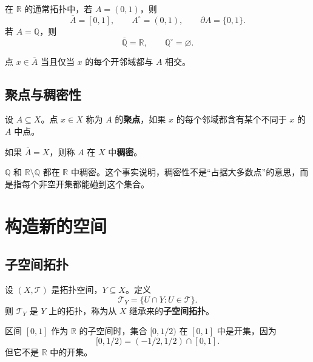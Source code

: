 \begin{example}
在 $\mathbb{R}$ 的通常拓扑中，若 $A=(0,1)$，则
\[
    \overline{A}=[0,1],\qquad A^\circ=(0,1),\qquad \partial A=\{0,1\}.
\]
若 $A=\mathbb{Q}$，则
\[
    \overline{\mathbb{Q}}=\mathbb{R},\qquad \mathbb{Q}^\circ=\varnothing.
\]
\end{example}

\begin{proposition}[用开邻域刻画闭包]
点 $x\in\overline{A}$ 当且仅当 $x$ 的每个开邻域都与 $A$ 相交。
\end{proposition}

\subsection{聚点与稠密性}

\begin{definition}[聚点]
设 $A\subseteq X$。点 $x\in X$ 称为 $A$ 的\textbf{聚点}，如果 $x$ 的每个邻域都含有某个不同于 $x$ 的 $A$ 中点。
\end{definition}

\begin{definition}[稠密子集]
如果 $\overline{A}=X$，则称 $A$ 在 $X$ 中\textbf{稠密}。
\end{definition}

\begin{example}
$\mathbb{Q}$ 和 $\mathbb{R}\setminus\mathbb{Q}$ 都在 $\mathbb{R}$ 中稠密。这个事实说明，稠密性不是“占据大多数点”的意思，而是指每个非空开集都能碰到这个集合。
\end{example}

\section{构造新的空间}

\subsection{子空间拓扑}

\begin{definition}[子空间拓扑]
设 $(X,\mathcal{T})$ 是拓扑空间，$Y\subseteq X$。定义
\[
    \mathcal{T}_Y=\{U\cap Y:U\in\mathcal{T}\}.
\]
则 $\mathcal{T}_Y$ 是 $Y$ 上的拓扑，称为从 $X$ 继承来的\textbf{子空间拓扑}。
\end{definition}

\begin{example}
区间 $[0,1]$ 作为 $\mathbb{R}$ 的子空间时，集合 $[0,1/2)$ 在 $[0,1]$ 中是开集，因为
\[
    [0,1/2)=(-1/2,1/2)\cap[0,1].
\]
但它不是 $\mathbb{R}$ 中的开集。
\end{example}

